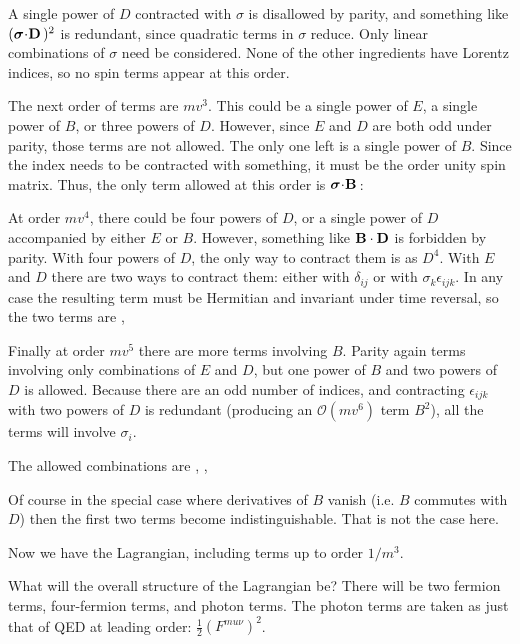 A single power of $D$ contracted with $\sigma$ is disallowed by parity, and something like $(\mbox{\boldmath$ \sigma $} \hspace{-2pt} \cdot \hspace{-2pt} \mathbf{D} \,)^2$ is redundant, since quadratic terms in $\sigma$ reduce.  Only linear combinations of $\sigma$ need be considered.  None of the other ingredients have Lorentz indices, so no spin terms appear at this order.

The next order of terms are $mv^3$.  This could be a single power of $E$, a single power of $B$, or three powers of $D$.  However, since $E$ and $D$ are both odd under parity, those terms are not allowed.  The only one left is a single power of $B$.  Since the index needs to be contracted with something, it must be the order unity spin matrix.  Thus, the only term allowed at this order is $\mbox{\boldmath$ \sigma $} \hspace{-2pt} \cdot \hspace{-2pt} \mathbf{B} \,$:
\beq
\eeq

At order $mv^4$, there could be four powers of $D$, or a single power of $D$ accompanied by either $E$ or $B$.  However, something like $\mathbf{B} \cdot \mathbf{D}$ is forbidden by parity.  With four powers of $D$, the only way to contract them is as $D^4$.  With $E$ and $D$ there are two ways to contract them: either with $\delta_{ij}$ or with $\sigma_k \epsilon_{ijk}$.  In any case the resulting term must be Hermitian and invariant under time reversal, so the two terms are
\beq
	 , \;  
\eeq 

Finally at order $mv^5$ there are more terms involving $B$.  Parity again terms involving only combinations of $E$ and $D$, but one power of $B$ and two powers of $D$ is allowed.  Because there are an odd number of indices, and contracting $\epsilon_{ijk}$ with two powers of $D$ is redundant (producing an $\mathcal{O}(mv^6)$ term $B^2$), all the terms will involve $\sigma_i$.

The allowed combinations are
\beq
  ,  \;
			, 	\;
\eeq

Of course in the special case where derivatives of $B$ vanish (i.e. $B$ commutes with $D$) then the first two terms become indistinguishable.  That is not the case here.



Now we have the Lagrangian, including terms up to order $1/m^3$.  

What will the overall structure of the Lagrangian be?  There will be two fermion terms, four-fermion terms, and photon terms.  The photon terms are taken as just that of QED at leading order: $\frac{1}{2} (F^{mu\nu})^2$.  

